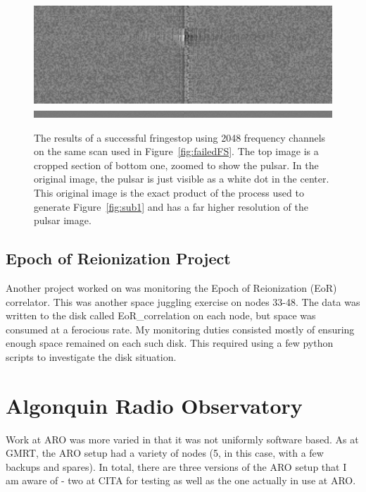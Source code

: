 \documentclass[a4paper,12pt]{article}
\begin{document}
\begin{figure}
\centering
\includegraphics[width=\linewidth]{4096ChanLag.pdf}
\includegraphics[width=\linewidth]{lag102.pdf}
\caption{The results of a successful fringestop using 2048 frequency channels on the same scan used in Figure~\ref{fig:failedFS}. The top image is a cropped section of bottom one, zoomed to show the pulsar. In the original image, the pulsar is just visible as a white dot in the center. This original image is the exact product of the process used to generate Figure~\ref{fig:sub1} and has a far higher resolution of the pulsar image.}
\label{fig:successfulFS}
\end{figure}

\subsection{Epoch of Reionization Project}
\label{sec:eor}

Another project worked on was monitoring the Epoch of Reionization (EoR) correlator. This was another space juggling exercise on nodes 33-48. The data was written to the disk called EoR\_correlation on each node, but space was consumed at a ferocious rate. My monitoring duties consisted mostly of ensuring enough space remained on each such disk. This required using a few python scripts to investigate the disk situation.

\section{Algonquin Radio Observatory}
\label{sec:aro}

Work at ARO was more varied in that it was not uniformly software based. As at GMRT, the ARO setup had a variety of nodes (5, in this case, with a few backups and spares). In total, there are three versions of the ARO setup that I am aware of  - two at CITA for testing as well as the one actually in use at ARO.
\end{document}
